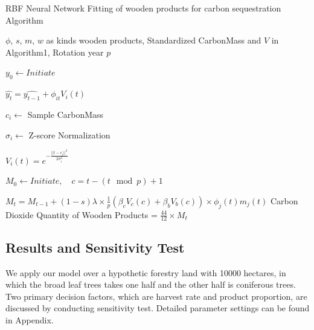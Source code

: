 \documentclass{mcmthesis}
\numberwithin{figure}{section}
\numberwithin{table}{section}
\numberwithin{equation}{section}
\begin{document}
\begin{algorithm}[htbp]
  \caption{RBF Neural Network Fitting of wooden products for carbon sequestration Algorithm} \label{Product Algo}
  \begin{algorithmic}[1]
      \Require
          $ \phi $, $ s $, $ m $, $ w $ as kinds wooden products, Standardized CarbonMass and $ V $ in Algorithm1,
          Rotation year $ p $ 

              $ y_0 \gets Initiate $ 

              $ \hat{y_t} = \hat{y_{t-1}} + \phi_{it}V_i(t) $
          
              $ c_i\gets $ Sample CarbonMass
          
              $ \sigma_i\gets $ Z-score Normalization

              $ V_i(t) = e^{-\frac{||t-c_i||^2}{2\sigma_i^2}} $
          \EndFor

          $ M_0\gets Initiate, \quad c = t-(t\mod p)+1$ 



          $ M_t = M_{t-1}+(1-s)\lambda \times \frac{1}{p} (\beta_cV_c(c)+\beta_bV_b(c))\times \phi_j(t)m_j(t)$ 
          \EndFor
      \EndFor
      \Ensure
      Carbon Dioxide Quantity of Wooden Products = $ \frac{44}{12} \times M_t$ 
  \end{algorithmic}
\end{algorithm}



\subsection{Results and Sensitivity Test}

We apply our model over a hypothetic forestry land with 10000 hectares, in which
the broad leaf trees takes one half and the other half is coniferous trees. Two
primary decision factors, which are harvest rate and product proportion,
are discussed by conducting sensitivity test. Detailed parameter settings can
be found in Appendix. 

\end{document}
